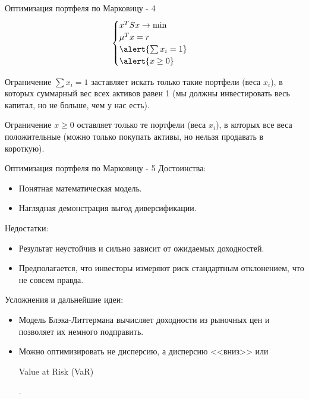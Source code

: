 \documentclass{beamer}
\newcommand{\en}[1]{\begin{otherlanguage}{english}#1\end{otherlanguage}}
\begin{document}
\begin{frame}{Оптимизация портфеля по Марковицу - 4}
\begin{align*}
\begin{cases}
x^TS x \to \min \\
\mu^Tx = r \\
\alert{\sum x_i = 1} \\
\alert{x \ge 0}
\end{cases}
\end{align*}

\justify
Ограничение $\sum x_i = 1$ заставляет искать только такие портфели (веса 
$x_i$), в которых суммарный вес всех активов равен 1 (мы должны инвестировать 
весь капитал, но не больше, чем у нас есть).

\justify
Ограничение $x \ge 0$ оставляет только те портфели (веса $x_i$), в которых все 
веса положительные (можно только покупать активы, но нельзя продавать в 
короткую).
\end{frame}



\begin{frame}{Оптимизация портфеля по Марковицу - 5}
\justify
Достоинства:
\begin{itemize}
\justifying
\item Понятная математическая модель.
\item Наглядная демонстрация выгод диверсификации.
\end{itemize}

\justify
Недостатки:
\begin{itemize}
\justifying
\item Результат неустойчив  и сильно зависит от ожидаемых доходностей.
\item Предполагается, что инвесторы измеряют риск стандартным отклонением, что не совсем правда.
\end{itemize}

\justify
Усложнения и дальнейшие идеи:
\begin{itemize}
\justifying
\item Модель Блэка-Литтермана вычисляет доходности из рыночных цен и позволяет 
их немного подправить.
\item Можно оптимизировать не дисперсию, а дисперсию <<вниз>> или
\en{Value at Risk (VaR)}.
\end{itemize}
\end{frame}
\end{document}

